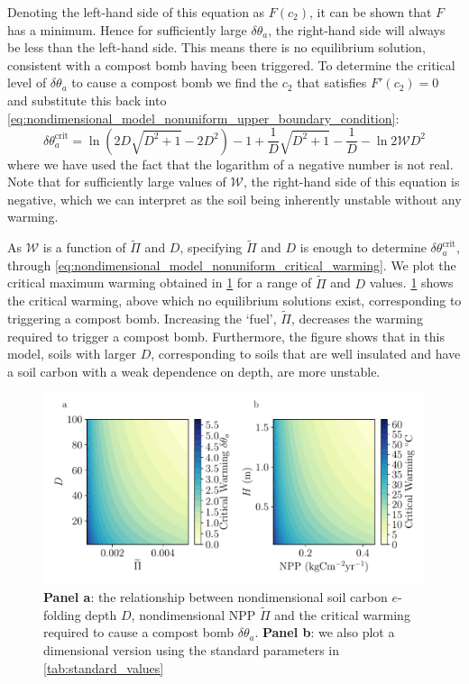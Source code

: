 Denoting the left-hand side of this equation as $F(c_2)$, it can be shown that $F$ has a minimum. Hence for sufficiently large $\delta\theta_a$, the right-hand side will always
be less than the left-hand side. This means there is no equilibrium solution, consistent with a compost bomb having been triggered. To determine the critical level of $\delta\theta_a$ to cause a compost bomb
we find the $c_2$ that satisfies $F'(c_2) = 0$ and substitute this back into \cref{eq:nondimensional_model_nonuniform_upper_boundary_condition}:
\begin{equation}
  \label{eq:nondimensional_model_nonuniform_critical_warming}
  \delta\theta_a^{\mathrm{crit}} = \ln \left(2D\sqrt{D^2 +1} - 2D^2\right) -1 + \frac{1}{D} \sqrt{D^2 + 1} - \frac{1}{D} - \ln 2\mathcal{W}D^2
\end{equation}
where we have used the fact that the logarithm of a negative number is not real.
Note that for sufficiently large values of $\mathcal{W}$, the right-hand side of this equation is negative, which we can interpret as the soil being inherently unstable without any warming.

As $\mathcal{W}$ is a function of $\widetilde{\Pi}$ and $D$, specifying $\widetilde{\Pi}$ and $D$ is enough to determine $\delta\theta_a^{\mathrm{crit}}$, through
\cref{eq:nondimensional_model_nonuniform_critical_warming}. We plot the critical maximum warming obtained in \cref{fig:critical_theta_a} for a range of $\widetilde{\Pi}$ and $D$ values.
\cref{fig:critical_theta_a} shows the critical warming, above which no equilibrium solutions exist, corresponding to triggering a compost bomb.
Increasing the `fuel', $\widetilde{\Pi}$, decreases the warming
required to trigger a compost bomb. Furthermore, the figure shows that in this model, soils with larger $D$, corresponding to soils that are well insulated and have a
soil carbon with a weak dependence on depth, are more unstable.
\begin{figure}
  \centering
  \includegraphics[keepaspectratio,scale=0.5]{static_dim_and_nondim}
  \caption{\textbf{Panel a}: the relationship between nondimensional soil carbon $e$-folding depth $D$, nondimensional NPP $\widetilde{\Pi}$ and the critical warming required to cause a compost
    bomb $\delta\theta_a$. \textbf{Panel b}: we also plot a dimensional version using the standard parameters in \cref{tab:standard_values}}
  \label{fig:critical_theta_a}
\end{figure}


